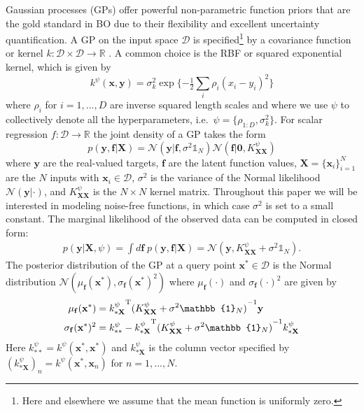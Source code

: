 \documentclass[accepted]{uai2021} %
\newcommand{\by}{\mathbf{y}}
\newcommand{\bff}{\mathbf{f}}
\newcommand{\bx}{\mathbf{x}}
\newcommand{\bX}{\mathbf{X}}
\newcommand{\DD}{\mathcal{D}}
\newcommand{\NN}{\mathcal{N}}
\begin{document}
Gaussian processes (GPs) offer powerful non-parametric function priors that are the gold standard
in BO due to their flexibility and excellent uncertainty quantification.
A GP on the input space $\DD$
is specified\footnote{Here and elsewhere we assume that the mean function is uniformly zero.}
 by a covariance function or kernel $k:\DD\times \DD \to \mathbb{R}$ \citep{rasmussen2003gaussian}.
 A common choice is the RBF or squared exponential kernel, which is given by
\begin{equation}
k^\psi(\bx, \by) = \sigma_k^2 \exp \{ -\tfrac{1}{2} \sum_i \rho_i (x_i - y_i)^2 \}
\end{equation}
where $\rho_i$ for $i=1,...,D$ are inverse squared length scales
and where we use $\psi$ to collectively denote all the hyperparameters, i.e.~$\psi = \{\rho_{1:D}, \sigma_k^2\}$.
For scalar regression $f: \DD \to \mathbb{R}$ the joint density of a GP takes the form
\begin{equation}
p(\by, \bff | \bX) = \NN(\by|\bff, \sigma^2 \mathbb{1}_N) \NN(\bff | \bm{0}, K^{\psi}_{\bX\bX})
\end{equation}
where $\by$ are the real-valued targets, $\bff$ are the latent function values,
$\bX = \{ \bx_i \}_{i=1}^N$ are the $N$ inputs with $\bx_i \in \DD$,
$\sigma^2$ is the variance of the Normal likelihood $\NN(\by|\cdot)$,
and $K^{\psi}_{\bX\bX}$ is the $N \times N$ kernel matrix.
Throughout this paper we will be interested in modeling noise-free functions,
in which case $\sigma^2$ is set to a small constant.
The marginal likelihood of the observed data can be computed in closed form:
\begin{align}
\label{eqn:mll}
p(\by|\bX, \psi) = \int \! d \bff \; p(\by, \bff | \bX)    %
                = \NN(\by, K^{\psi}_{\bX\bX} + \sigma^2 \mathbb{1}_N).
\end{align}
The posterior distribution of the GP at a query point $\bx^* \in \DD$ is the
Normal distribution $\NN(\mu_\bff(\bx^*), \sigma_\bff(\bx^*)^2)$
where $\mu_\bff(\cdot)$ and $\sigma_\bff(\cdot)^2$ are given by
\begin{align}
\label{eqn:gppredmean}
\mu_\bff(\bx^*) &= {k^{\psi}_{* \bX}}^{\rm T}  {(K^{\psi}_{\bX\bX} + \sigma^2 \mathbb{1}_N)}^{-1}\by    \\
\label{eqn:gppredvar}
\sigma_\bff(\bx^*)^2 &=  k^{\psi}_{**} - {k^{\psi}_{* \bX}}^{\rm T}  {(K^{\psi}_{\bX\bX} + \sigma^2 \mathbb{1}_N)}^{-1}    {k^{\psi}_{* \bX}}
\end{align}
Here $k^{\psi}_{**} =  k^\psi(\bx^*, \bx^*) $ and ${k^{\psi}_{* \bX}}$ is the column vector specified by $({k^{\psi}_{* \bX}})_n=k^\psi(\bx^*, \bx_n)$ for
$n=1,...,N$.
\end{document}
